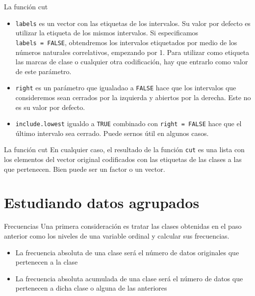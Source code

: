 \documentclass[
  ignorenonframetext,
]{beamer}
\providecommand{\tightlist}{%
  \setlength{\itemsep}{0pt}\setlength{\parskip}{0pt}}
\begin{document}
\begin{frame}[fragile]{La función cut}
\label{la-funciuxf3n-cut-1}
\begin{itemize}
\tightlist
\item
  \texttt{labels} es un vector con las etiquetas de los intervalos. Su
  valor por defecto es utilizar la etiqueta de los mismos intervalos. Si
  especificamos \texttt{labels\ =\ FALSE}, obtendremos los intervalos
  etiquetados por medio de los números naturales correlativos, empezando
  por 1. Para utilizar como etiqueta las marcas de clase o cualquier
  otra codificación, hay que entrarlo como valor de este parámetro.
\item
  \texttt{right} es un parámetro que igualadao a \texttt{FALSE} hace que
  los intervalos que consideremos sean cerrados por la izquierda y
  abiertos por la derecha. Este no es su valor por defecto.
\item
  \texttt{include.lowest} igualdo a \texttt{TRUE} combinado con
  \texttt{right\ =\ FALSE} hace que el último intervalo sea cerrado.
  Puede sernos útil en algunos casos.
\end{itemize}
\end{frame}

\begin{frame}[fragile]{La función cut}
\label{la-funciuxf3n-cut-2}
En cualquier caso, el resultado de la función \texttt{cut} es una lista
con los elementos del vector original codificados con las etiquetas de
las clases a las que pertenecen. Bien puede ser un factor o un vector.
\end{frame}

\section{Estudiando datos agrupados}\label{estudiando-datos-agrupados}

\begin{frame}{Frecuencias}
\label{frecuencias}
Una primera consideración es tratar las clases obtenidas en el paso
anterior como los niveles de una variable ordinal y calcular sus
frecuencias.

\begin{itemize}
\tightlist
\item
  La frecuencia absoluta de una clase será el número de datos originales
  que pertenecen a la clase
\item
  La frecuencia absoluta acumulada de una clase será el número de datos
  que pertenecen a dicha clase o alguna de las anteriores
\end{itemize}
\end{frame}
\end{document}
